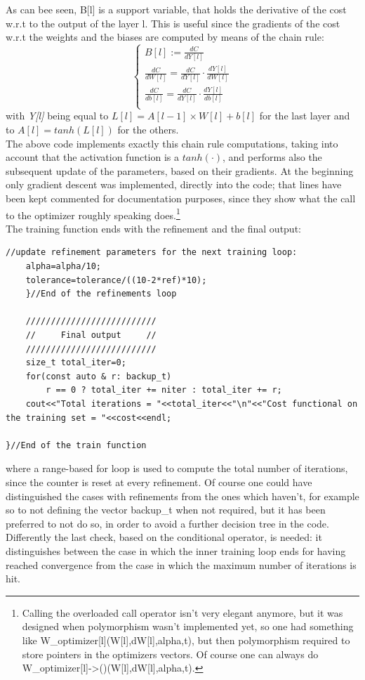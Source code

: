 \documentclass[12pt, a4paper]{report}
\theoremstyle{definition}
\begin{document}
\noindent As can bee seen, {\ttfamily B[l]} is a support variable, that holds the derivative of the cost w.r.t to the output of the layer {\ttfamily l}. This is useful since the gradients of the cost w.r.t the weights and the biases are computed by means of the chain rule:
\begin{equation*}
	\begin{cases}
	B[l] := \frac{dC}{dY[l]}\\ 
	\frac{dC}{dW[l]} = \frac{dC}{dY[l]} \cdot \frac{dY[l]}{dW[l]} \\
	\frac{dC}{db[l]} = \frac{dC}{dY[l]} \cdot \frac{dY[l]}{db[l]} \\
	\end{cases}
\end{equation*} 
with \textit{Y[l]} being equal to $L[l]=A[l-1]\times W[l]+b[l]$ for the last layer and to $A[l]=tanh(L[l])$ for the others.\\
The above code implements exactly this chain rule computations, taking into account that the activation function is a $tanh(\cdot)$, and performs also the subsequent update of the parameters, based on their gradients. At the beginning only gradient descent was implemented, directly into the code; that lines have been kept commented for documentation purposes, since they show what the call to the optimizer roughly speaking does.\footnote{Calling the overloaded call operator isn't very elegant anymore, but it was designed when polymorphism wasn't implemented yet, so one had something like {\ttfamily W\_optimizer[l](W[l],dW[l],alpha,t)}, but then polymorphism required to store pointers in the optimizers vectors. Of course one can always do {\ttfamily W\_optimizer[l]->()(W[l],dW[l],alpha,t)}.}\\
\noindent The training function ends with the refinement and the final output:
\begin{lstlisting}[frame=single, showstringspaces=false]
	//update refinement parameters for the next training loop:
	alpha=alpha/10;
	tolerance=tolerance/((10-2*ref)*10);
	}//End of the refinements loop

	//////////////////////////
	//     Final output     //
	//////////////////////////
	size_t total_iter=0;
	for(const auto & r: backup_t)
		r == 0 ? total_iter += niter : total_iter += r;
	cout<<"Total iterations = "<<total_iter<<"\n"<<"Cost functional on the training set = "<<cost<<endl;

}//End of the train function
\end{lstlisting}
where a range-based for loop is used to compute the total number of iterations, since the counter is reset at every refinement. Of course one could have distinguished the cases with refinements from the ones which haven't, for example so to not defining the vector {\ttfamily backup\_t} when not required, but it has been preferred to not do so, in order to avoid a further decision tree in the code. Differently the last check, based on the conditional operator, is needed: it distinguishes between the case in which the inner training loop ends for having reached convergence from the case in which the maximum number of iterations is hit.\\
\end{document}
